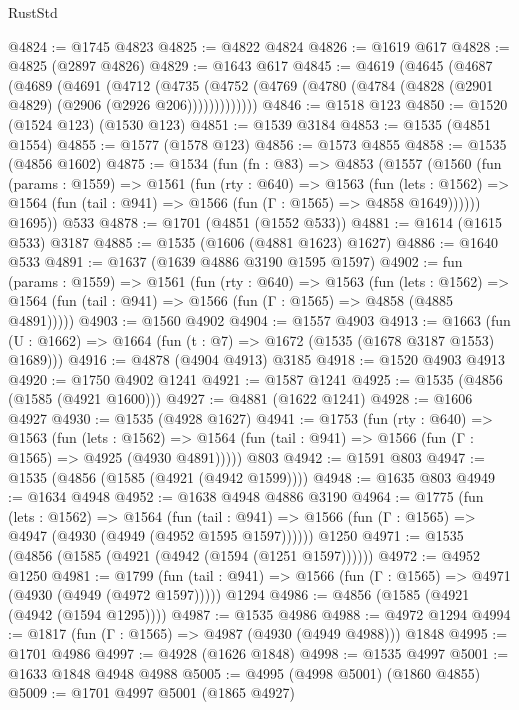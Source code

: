 \begin{lexlean}{RustStd}
\begin{coremodule}
@4824 := @1745 @4823
@4825 := @4822 @4824
@4826 := @1619 @617
@4828 := @4825 (@2897 @4826)
@4829 := @1643 @617
@4845 := @4619
    (@4645
      (@4687
        (@4689
          (@4691
            (@4712
              (@4735
                (@4752 (@4769 (@4780 (@4784 (@4828 (@2901 @4829) (@2906 (@2926 @206)))))))))))))
@4846 := @1518 @123
@4850 := @1520 (@1524 @123) (@1530 @123)
@4851 := @1539 @3184
@4853 := @1535 (@4851 @1554)
@4855 := @1577 (@1578 @123)
@4856 := @1573 @4855
@4858 := @1535 (@4856 @1602)
@4875 := @1534
    (fun (fn : @83) =>
    @4853
      (@1557
        (@1560
          (fun (params : @1559) =>
          @1561
            (fun (rty : @640) =>
            @1563
              (fun (lets : @1562) =>
              @1564 (fun (tail : @941) => @1566 (fun (Γ : @1565) => @4858 @1649))))))
        @1695))
    @533
@4878 := @1701 (@4851 (@1552 @533))
@4881 := @1614 (@1615 @533) @3187
@4885 := @1535 (@1606 (@4881 @1623) @1627)
@4886 := @1640 @533
@4891 := @1637 (@1639 @4886 @3190 @1595 @1597)
@4902 := fun (params : @1559) =>
  @1561
    (fun (rty : @640) =>
    @1563
      (fun (lets : @1562) =>
      @1564 (fun (tail : @941) => @1566 (fun (Γ : @1565) => @4858 (@4885 @4891)))))
@4903 := @1560 @4902
@4904 := @1557 @4903
@4913 := @1663 (fun (U : @1662) => @1664 (fun (t : @7) => @1672 (@1535 (@1678 @3187 @1553) @1689)))
@4916 := @4878 (@4904 @4913) @3185
@4918 := @1520 @4903 @4913
@4920 := @1750 @4902 @1241
@4921 := @1587 @1241
@4925 := @1535 (@4856 (@1585 (@4921 @1600)))
@4927 := @4881 (@1622 @1241)
@4928 := @1606 @4927
@4930 := @1535 (@4928 @1627)
@4941 := @1753
    (fun (rty : @640) =>
    @1563
      (fun (lets : @1562) =>
      @1564 (fun (tail : @941) => @1566 (fun (Γ : @1565) => @4925 (@4930 @4891)))))
    @803
@4942 := @1591 @803
@4947 := @1535 (@4856 (@1585 (@4921 (@4942 @1599))))
@4948 := @1635 @803
@4949 := @1634 @4948
@4952 := @1638 @4948 @4886 @3190
@4964 := @1775
    (fun (lets : @1562) =>
    @1564
      (fun (tail : @941) => @1566 (fun (Γ : @1565) => @4947 (@4930 (@4949 (@4952 @1595 @1597))))))
    @1250
@4971 := @1535 (@4856 (@1585 (@4921 (@4942 (@1594 (@1251 @1597))))))
@4972 := @4952 @1250
@4981 := @1799
    (fun (tail : @941) => @1566 (fun (Γ : @1565) => @4971 (@4930 (@4949 (@4972 @1597)))))
    @1294
@4986 := @4856 (@1585 (@4921 (@4942 (@1594 @1295))))
@4987 := @1535 @4986
@4988 := @4972 @1294
@4994 := @1817 (fun (Γ : @1565) => @4987 (@4930 (@4949 @4988))) @1848
@4995 := @1701 @4986
@4997 := @4928 (@1626 @1848)
@4998 := @1535 @4997
@5001 := @1633 @1848 @4948 @4988
@5005 := @4995 (@4998 @5001) (@1860 @4855)
@5009 := @1701 @4997 @5001 (@1865 @4927)

\end{coremodule}
\end{lexlean}
